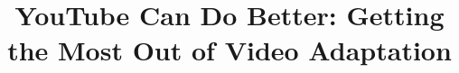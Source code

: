 \documentclass[10pt, twocolumn, a4paper, conference]{IEEEtran}
\begin{document}
\title{YouTube Can Do Better: Getting the Most Out of Video Adaptation}

\end{document}
